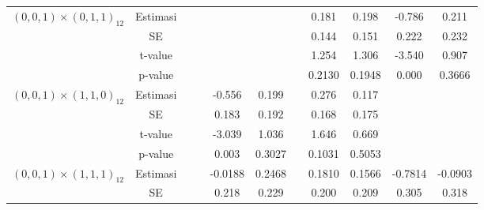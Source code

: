 \begin{enumerate}[label=\alph*.]
\begin{longtable}{|c|c|c|c|c|c|c|c|c|c|c|}
            \multirow{4}{*}{$(0,0,1)\times(0,1,1)_{12}$}
            & Estimasi
            & {} & {}
            & {} & {} & {}
            & {0.181} & {0.198}
            & {-0.786} & {0.211} \\ \cline{2-11}

            & SE
            & {} & {}
            & {} & {} & {}
            & {0.144} & {0.151}
            & {0.222} & {0.232} \\ \cline{2-11}

            & t-value
            & {} & {}
            & {} & {} & {}
            & {1.254} & {1.306}
            & {-3.540} & {0.907} \\ \cline{2-11}

            & p-value
            & {} & {}
            & {} & {} & {}
            & {0.2130} & {0.1948}
            & {0.000} & {0.3666} \\ \hline

            \multirow{4}{*}{$(0,0,1)\times(1,1,0)_{12}$}
            & Estimasi
            & {} & {}
            & {-0.556} & {0.199} & {}
            & {0.276} & {0.117}
            & {} & {} \\ \cline{2-11}

            & SE
            & {} & {}
            & {0.183} & {0.192} & {}
            & {0.168} & {0.175}
            & {} & {} \\ \cline{2-11}

            & t-value
            & {} & {}
            & {-3.039} & {1.036} & {}
            & {1.646} & {0.669}
            & {} & {} \\ \cline{2-11}

            & p-value
            & {} & {}
            & {0.003} & {0.3027} & {}
            & {0.1031} & {0.5053}
            & {} & {} \\ \hline

            \multirow{4}{*}{$(0,0,1)\times(1,1,1)_{12}$}
            & Estimasi
            & {} & {}
            & {-0.0188} & {0.2468} & {}
            & {0.1810} & {0.1566}
            & {-0.7814} & {-0.0903} \\ \cline{2-11}

            & SE
            & {} & {}
            & {0.218} & {0.229} & {}
            & {0.200} & {0.209}
            & {0.305} & {0.318} \\ \cline{2-11}


\end{longtable}
\end{enumerate}
